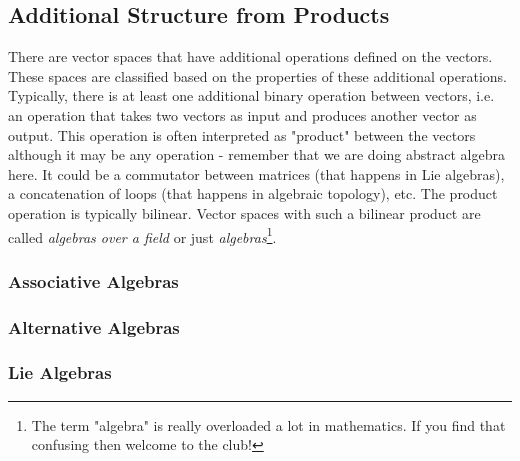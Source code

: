\subsection{Additional Structure from Products} 
There are vector spaces that have additional operations defined on the vectors. These spaces are classified based on the properties of these additional operations. Typically, there is at least one additional binary operation between vectors, i.e. an operation that takes two vectors as input and produces another vector as output. This operation is often interpreted as "product" between the vectors although it may be any operation - remember that we are doing abstract algebra here. It could be a commutator between matrices (that happens in Lie algebras), a concatenation of loops (that happens in algebraic topology), etc. The product operation is typically bilinear. Vector spaces with such a bilinear product are called \emph{algebras over a field} or just \emph{algebras}\footnote{The term "algebra" is really overloaded a lot in mathematics. If you find that confusing then welcome to the club!}.





\subsubsection{Associative Algebras} 

\subsubsection{Alternative Algebras} 

\subsubsection{Lie Algebras} 

